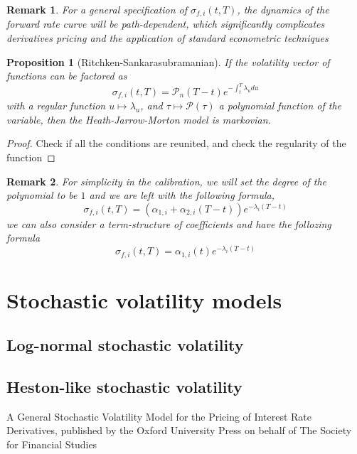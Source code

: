 \documentclass{article}
\newtheorem{proposition}[theorem]{Proposition}
\newtheorem{remark}{Remark}[section]
\begin{document}
\begin{remark}
	For a general specification of $\sigma_{f,i} (t, T )$, the dynamics of the forward rate
curve will be path-dependent, which significantly complicates derivatives pricing
and the application of standard econometric techniques
\end{remark}

\begin{proposition}[Ritchken-Sankarasubramanian]
	If the volatility vector of functions can be factored as 
	\begin{equation}
		\sigma_{f,i}(t,T) = \mathcal{P}_n(T-t) e^{-\int_t^T \lambda_u du}
	\end{equation}
	with a regular function $u \mapsto \lambda_u$, and $\tau \mapsto \mathcal{P}(\tau)$ a polynomial function of the variable, then the Heath-Jarrow-Morton model is markovian.
\end{proposition}

\begin{proof}
	Check if all the conditions are reunited, and check the regularity of the function
\end{proof}

\begin{remark}	
	For simplicity in the calibration, we will set the degree of the polynomial to be $1$ and we are left with the following formula, 
	\begin{equation}
		\sigma_{f,i}(t,T) = \left(\alpha_{1,i} + \alpha_{2,i} (T-t) \right) e^{-\lambda_i (T-t)}
	\end{equation}
	we can also consider a term-structure of coefficients and have the follozing formula
	\begin{equation}
		\sigma_{f,i}(t,T) = \alpha_{1,i}(t) e^{-\lambda_i (T-t)}
	\end{equation}
\end{remark}

\section{Stochastic volatility models}
\subsection{Log-normal stochastic volatility}

\subsection{Heston-like stochastic volatility}

\begin{thebibliography}{9}
	 A General Stochastic Volatility Model for the Pricing of Interest Rate Derivatives, published by the Oxford University Press on behalf of The Society for Financial Studies
\end{thebibliography}
\end{document}
